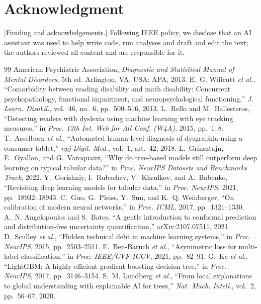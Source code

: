 \documentclass[conference]{IEEEtran}
\begin{document}
\section*{Acknowledgment}
[Funding and acknowledgements.] Following IEEE policy, we disclose that an AI assistant was used to help write code, run analyses and draft and edit the text; the authors reviewed all content and are responsible for it.

\begin{thebibliography}{99}
 American Psychiatric Association, \emph{Diagnostic and Statistical Manual of Mental Disorders}, 5th ed. Arlington, VA, USA: APA, 2013.
 E.~G. Willcutt \emph{et al.}, ``Comorbidity between reading disability and math disability: Concurrent psychopathology, functional impairment, and neuropsychological functioning,'' \emph{J. Learn. Disabil.}, vol.~46, no.~6, pp.~500--516, 2013.
 L.~Rello and M.~Ballesteros, ``Detecting readers with dyslexia using machine learning with eye tracking measures,'' in \emph{Proc. 12th Int. Web for All Conf. (W4A)}, 2015, pp.~1--8.
 T.~Asselborn \emph{et al.}, ``Automated human-level diagnosis of dysgraphia using a consumer tablet,'' \emph{npj Digit. Med.}, vol.~1, art.~42, 2018.
 L.~Grinsztajn, E.~Oyallon, and G.~Varoquaux, ``Why do tree-based models still outperform deep learning on typical tabular data?'' in \emph{Proc. NeurIPS Datasets and Benchmarks Track}, 2022.
 Y.~Gorishniy, I.~Rubachev, V.~Khrulkov, and A.~Babenko, ``Revisiting deep learning models for tabular data,'' in \emph{Proc. NeurIPS}, 2021, pp.~18932--18943.
 C.~Guo, G.~Pleiss, Y.~Sun, and K.~Q. Weinberger, ``On calibration of modern neural networks,'' in \emph{Proc. ICML}, 2017, pp.~1321--1330.
 A.~N. Angelopoulos and S.~Bates, ``A gentle introduction to conformal prediction and distribution-free uncertainty quantification,'' arXiv:2107.07511, 2021.
 D.~Sculley \emph{et al.}, ``Hidden technical debt in machine learning systems,'' in \emph{Proc. NeurIPS}, 2015, pp.~2503--2511.
 E.~Ben-Baruch \emph{et al.}, ``Asymmetric loss for multi-label classification,'' in \emph{Proc. IEEE/CVF ICCV}, 2021, pp.~82--91.
 G.~Ke \emph{et al.}, ``LightGBM: A highly efficient gradient boosting decision tree,'' in \emph{Proc. NeurIPS}, 2017, pp.~3146--3154.
 S.~M. Lundberg \emph{et al.}, ``From local explanations to global understanding with explainable AI for trees,'' \emph{Nat. Mach. Intell.}, vol.~2, pp.~56--67, 2020.

\end{thebibliography}
\end{document}
